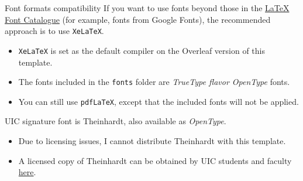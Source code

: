 \documentclass{beamer}
\newcommand{\hrefcol}[2]{\textcolor{gtbuzzgold}{\href{#1}{#2}}}
\begin{document}
\begin{frame}[fragile]{Font formats compatibility}
If you want to use fonts beyond those in the \hrefcol{https://tug.org/FontCatalogue/}{LaTeX Font Catalogue} (for example, fonts from Google Fonts), the recommended approach is to use \verb|XeLaTeX|.
\begin{itemize}
\item \verb|XeLaTeX| is set as the default compiler on the Overleaf version of this template.
\item The fonts included in the \verb|fonts| folder are \emph{TrueType flavor OpenType} fonts.
\item You can still use \verb|pdfLaTeX|, except that the included fonts will not be applied.
\end{itemize}
UIC signature font is Theinhardt, also available as \emph{OpenType}.
\begin{itemize}
\item Due to licensing issues, I cannot distribute Theinhardt with this template.
\item A licensed copy of Theinhardt can be obtained by UIC students and faculty \hrefcol{https://marketing.uic.edu/marketing-toolbox/uic-fonts/}{here}.
\end{itemize}
\end{frame}







\backmatter
\end{document}
